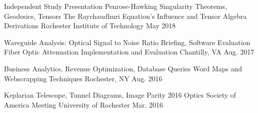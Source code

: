 \begin{cventries}
\cventry
   {Independent Study Presentation Penrose-Hawking Singularity Theorems, Geodesics, Tensors}
{The Raychaudhuri Equation's Influence and Tensor Algebra Derivations}
   {Rochester Institute of Technology}
   {May 2018}
   {
   }

 \cventry
    {Waveguide Analysis: Optical Signal to Noise Ratio Briefing, Software Evaluation}
    {Fiber Optic Attenuation Implementation and Evaluation}
    {Chantilly, VA}
    {Aug. 2017}
    {
    }


 \cventry
    {Business Analytics, Revenue Optimization, Database Queries}
    {Word Maps and Webscrapping Techniques}
    {Rochester, NY}
    {Aug. 2016}
    {
    }

 \cventry
    {Keplarian Telescope, Tunnel Diagrams, Image Parity}
    {2016 Optics Society of America Meeting}
    {University of Rochester}
    {Mar. 2016}
    {
    }    

    
  
\end{cventries}
